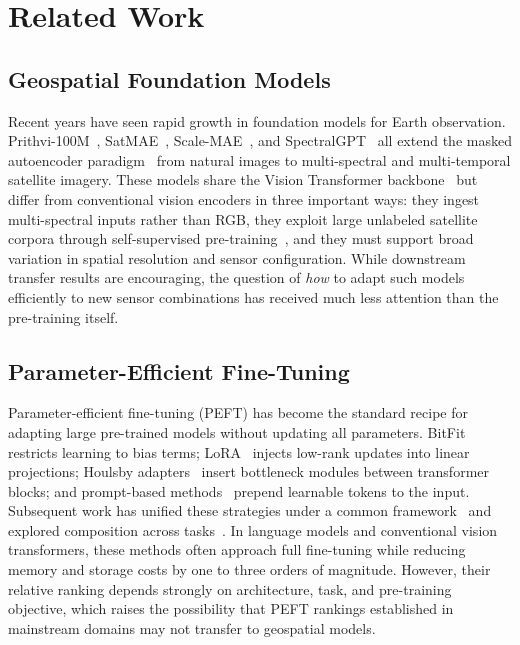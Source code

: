 \section{Related Work}

\subsection{Geospatial Foundation Models}
Recent years have seen rapid growth in foundation models for Earth observation. Prithvi-100M~\cite{jakubik2023prithvi}, SatMAE~\cite{cong2022satmae}, Scale-MAE~\cite{reed2023scalemae}, and SpectralGPT~\cite{hong2024spectralgpt} all extend the masked autoencoder paradigm~\cite{he2022mae} from natural images to multi-spectral and multi-temporal satellite imagery. These models share the Vision Transformer backbone~\cite{dosovitskiy2021vit} but differ from conventional vision encoders in three important ways: they ingest multi-spectral inputs rather than RGB, they exploit large unlabeled satellite corpora through self-supervised pre-training~\cite{manas2021seco,wang2022ssl4eo}, and they must support broad variation in spatial resolution and sensor configuration. While downstream transfer results are encouraging, the question of \emph{how} to adapt such models efficiently to new sensor combinations has received much less attention than the pre-training itself.

\subsection{Parameter-Efficient Fine-Tuning}
Parameter-efficient fine-tuning (PEFT) has become the standard recipe for adapting large pre-trained models without updating all parameters. BitFit~\cite{zaken2022bitfit} restricts learning to bias terms; LoRA~\cite{hu2022lora} injects low-rank updates into linear projections; Houlsby adapters~\cite{houlsby2019adapter} insert bottleneck modules between transformer blocks; and prompt-based methods~\cite{lester2021prompt,jia2022vpt} prepend learnable tokens to the input. Subsequent work has unified these strategies under a common framework~\cite{he2022unified} and explored composition across tasks~\cite{pfeiffer2020adapterfusion}. In language models and conventional vision transformers, these methods often approach full fine-tuning while reducing memory and storage costs by one to three orders of magnitude. However, their relative ranking depends strongly on architecture, task, and pre-training objective, which raises the possibility that PEFT rankings established in mainstream domains may not transfer to geospatial models.

